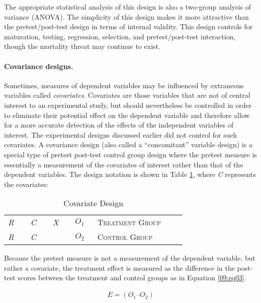 The appropriate statistical analysis of this design is also a two-group analysis of variance (ANOVA). The simplicity of this design makes it more attractive than the pretest/post-test design in terms of internal validity. This design controls for maturation, testing, regression, selection, and pretest/post-test interaction, though the mortality threat may continue to exist.

\paragraph{Covariance designs.} Sometimes, measures of dependent variables may be influenced by extraneous variables called \textit{covariates}. Covariates are those variables that are not of central interest to an experimental study, but should nevertheless be controlled in order to eliminate their potential effect on the dependent variable and therefore allow for a more accurate detection of the effects of the independent variables of interest. The experimental designs discussed earlier did not control for such covariates. A covariance design (also called a ``concomitant'' variable design) is a special type of pretest post-test control group design where the pretest measure is essentially a measurement of the covariates of interest rather than that of the dependent variables. The design notation is shown in Table \ref{09:tab03}, where \textit{C} represents the covariates:

\begin{table}[H]
	\centering
	\begin{tabularx}{0.85\linewidth}{p{0.10\linewidth}p{0.10\linewidth}p{0.10\linewidth}p{0.10\linewidth}p{0.40\linewidth}}
		\toprule
		\textit{R} & \textit{C} & \textit{X} & $ O_1 $ & \textsc{Treatment Group} \\
		\textit{R} & \textit{C} &            & $ O_2 $ & \textsc{Control Group} \\
		\bottomrule
	\end{tabularx}
	\caption{Covariate Design}
	\label{09:tab03}
\end{table}

Because the pretest measure is not a measurement of the dependent variable, but rather a covariate, the treatment effect is measured as the difference in the post-test scores between the treatment and control groups as in Equation \ref{09:eq03}.

\begin{align}
	\label{09:eq03}
	E = (O_1 – O_2)
\end{align}

